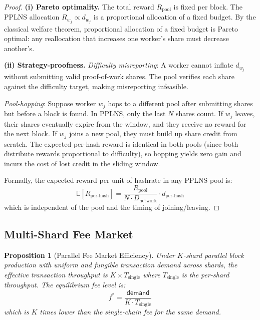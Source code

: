\documentclass[11pt,a4paper]{article}
\newtheorem{proposition}[theorem]{Proposition}
\theoremstyle{definition}
\theoremstyle{remark}
\newcommand{\reward}{R}
\newcommand{\expect}{\mathbb{E}}
\begin{document}
\begin{proof}
\textbf{(i) Pareto optimality.}
The total reward $\reward_{\text{pool}}$ is fixed per block.
The PPLNS allocation $\reward_{w_j} \propto d_{w_j}$ is a proportional
allocation of a fixed budget.
By the classical welfare theorem, proportional allocation of a fixed
budget is Pareto optimal: any reallocation that increases one worker's
share must decrease another's.

\textbf{(ii) Strategy-proofness.}
\emph{Difficulty misreporting}: A worker cannot inflate $d_{w_j}$ without
submitting valid proof-of-work shares.
The pool verifies each share against the difficulty target, making
misreporting infeasible.

\emph{Pool-hopping}: Suppose worker $w_j$ hops to a different pool
after submitting shares but before a block is found.
In PPLNS, only the last $N$ shares count.
If $w_j$ leaves, their shares eventually expire from the window, and
they receive no reward for the next block.
If $w_j$ joins a new pool, they must build up share credit from scratch.
The expected per-hash reward is identical in both pools (since both
distribute rewards proportional to difficulty), so hopping yields zero
gain and incurs the cost of lost credit in the sliding window.

Formally, the expected reward per unit of hashrate in any PPLNS pool is:
\[
  \expect[\reward_{\text{per-hash}}] = \frac{\reward_{\text{pool}}}{N
  \cdot D_{\text{network}}} \cdot d_{\text{per-hash}}
\]
which is independent of the pool and the timing of joining/leaving.
\end{proof}

\subsection{Multi-Shard Fee Market}

\begin{proposition}[Parallel Fee Market Efficiency]\label{prop:fee-market}
Under $K$-shard parallel block production with uniform and fungible
transaction demand across shards, the effective transaction
throughput is $K \times T_{\text{single}}$ where $T_{\text{single}}$
is the per-shard throughput.
The equilibrium fee level is:
\begin{equation}\label{eq:fee-equilibrium}
  f^* = \frac{\mathsf{demand}}{K \cdot T_{\text{single}}}
\end{equation}
which is $K$ times lower than the single-chain fee for the same demand.
\end{proposition}
\end{document}
